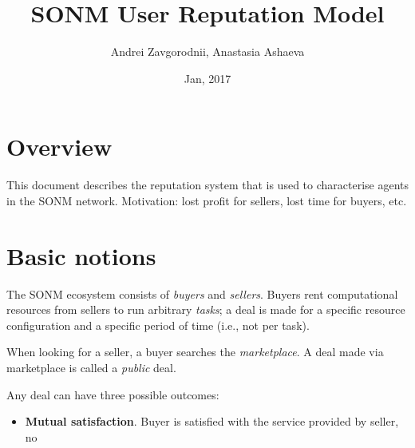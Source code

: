 \documentclass[11pt]{article}
\title{SONM User Reputation Model}
\author{Andrei Zavgorodnii, Anastasia Ashaeva}
\date{Jan, 2017}
\begin{document}
\maketitle
\tableofcontents
 
\section{Overview}

This document describes the reputation system that is used to characterise agents in the SONM network. Motivation: lost profit for sellers, lost time for buyers, etc.

\section{Basic notions}

The SONM ecosystem consists of \textit{buyers} and \textit{sellers}. Buyers rent computational resources from sellers to run arbitrary \textit{tasks}; a deal is made for a specific resource configuration and a specific period of time (i.e., not per task).

When looking for a seller, a buyer searches the \textit{marketplace}. A deal made via marketplace is called a \textit{public} deal.

Any deal can have three possible outcomes:

\begin{itemize}
\item \textbf{Mutual satisfaction}. Buyer is satisfied with the service provided by seller, no 
\end{itemize}

 
\end{document}
